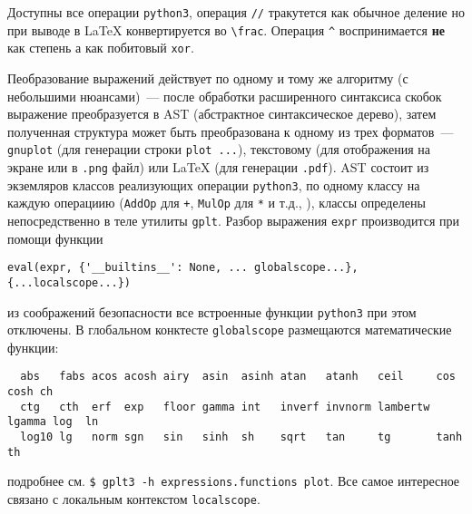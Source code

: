 \documentclass[12pt]{article}
\def\gplt{{\tt gplt}}
\def\gnuplot{{\tt gnuplot}}
\def\python{{\tt python3}}
\def\png{{\tt .png}}
\def\pdf{{\tt .pdf}}
\begin{document}
Доступны все операции \python{}, операция \verb'//' тракутется как обычное деление но при выводе в \LaTeX{} конвертируется во \verb'\frac'.
Операция \verb'^' воспринимается {\bf не} как степень а как побитовый \verb'xor'.

Пеобразование выражений действует по одному и тому же алгоритму (с небольшими нюансами)~--- после обработки расширенного синтаксиса скобок выражение преобразуется в AST
(абстрактное синтаксическое дерево), затем полученная структура может быть преобразована к одному из трех форматов~--- \gnuplot{} (для генерации
строки \verb'plot ...'), текстовому (для отображения на экране или в \png{} файл) или \LaTeX{} (для генерации \pdf).
AST состоит из экземляров классов реализующих операции \python, по одному классу на каждую операциию (\verb'AddOp' для \verb'+', \verb'MulOp' для \verb'*'
и т.д., \cite{aiv:symbalg:MM2015}),
классы определены непосредственно в теле утилиты \gplt. Разбор выражения \verb'expr' производится при помощи функции
\begin{verbatim}
eval(expr, {'__builtins__': None, ... globalscope...}, {...localscope...})
\end{verbatim}
из соображений безопасности все встроенные функции \python{} при этом отключены. В глобальном конктесте \verb'globalscope' размещаются математические функции:
\begin{verbatim}
  abs   fabs acos acosh airy  asin  asinh atan   atanh   ceil     cos    cosh ch   
  ctg   cth  erf  exp   floor gamma int   inverf invnorm lambertw lgamma log  ln
  log10 lg   norm sgn   sin   sinh  sh    sqrt   tan     tg       tanh   th 
\end{verbatim}
подробнее см. \verb'$ gplt3 -h expressions.functions plot'. Все самое интересное связано с локальным контекстом \verb'localscope'.
\end{document}
